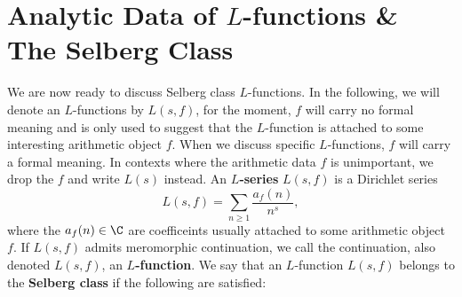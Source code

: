     \section{Analytic Data of \texorpdfstring{$L$}{L}-functions \& The Selberg Class}
      We are now ready to discuss Selberg class $L$-functions. In the following, we will denote an $L$-functions by $L(s,f)$, for the moment, $f$ will carry no formal meaning and is only used to suggest that the $L$-function is attached to some interesting arithmetic object $f$. When we discuss specific $L$-functions, $f$ will carry a formal meaning. In contexts where the arithmetic data $f$ is unimportant, we drop the $f$ and write $L(s)$ instead. An \textbf{$L$-series} $L(s,f)$ is a Dirichlet series
      \[
        L(s,f) = \sum_{n \ge 1}\frac{a_{f}(n)}{n^{s}},
      \]
      where the $a_{f}(n) \in \C$ are coefficeints usually attached to some arithmetic object $f$. If $L(s,f)$ admits meromorphic continuation, we call the continuation, also denoted $L(s,f)$, an \textbf{$L$-function}. We say that an $L$-function $L(s,f)$ belongs to the \textbf{Selberg class} if the following are satisfied:
